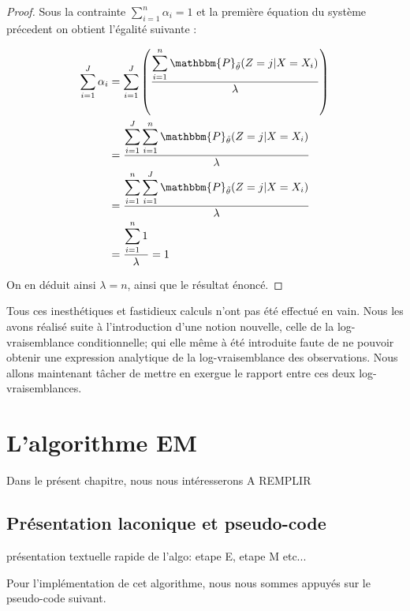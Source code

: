 \documentclass[frenchb]{report}
\newcommand{\1}{\mathbbm{1}}
\newcommand{\prob}{\mathbbm{P}}
\newcommand{\thetat}{\tilde{\theta}}
\theoremstyle{definition}\newtheorem{defn}{Définition}
\theoremstyle{definition}\newtheorem{exm}{Exemple}
\theoremstyle{definition}\newtheorem{nota}{Notation}
\theoremstyle{definition}\newtheorem{rem}{Remarque}
\begin{document}
\begin{proof}
Sous la contrainte $\displaystyle\sum_{i=1}^n\alpha_i =1$ et la première équation du système précedent on obtient l'égalité suivante : 

\begin{align*}
\sum_{i=1}^J\alpha_i &= \sum_{i=1}^J \left(\frac{\displaystyle\sum_{i=1}^n \prob_{\thetat}(Z=j|X=X_i)}{\lambda}\right)\\
&=\displaystyle\frac{\displaystyle\sum_{i=1}^J \sum_{i=1}^n \prob_{\thetat}(Z=j|X=X_i)}{\lambda}\\
&=\displaystyle\frac{\displaystyle\sum_{i=1}^n \sum_{i=1}^J \prob_{\thetat}(Z=j|X=X_i)}{\lambda}\\
&=\displaystyle\frac{\displaystyle\sum_{i=1}^n 1}{\lambda}= 1\\
\end{align*}

On en déduit ainsi $\lambda = n$, ainsi que le résultat énoncé.
\end{proof}


Tous ces inesthétiques et fastidieux calculs n'ont pas été effectué en vain. Nous les avons réalisé suite à l'introduction d'une notion nouvelle, celle de la log-vraisemblance conditionnelle; qui elle même à été introduite faute de ne pouvoir obtenir une expression analytique de la log-vraisemblance des observations. Nous allons maintenant tâcher de mettre en exergue le rapport entre ces deux log-vraisemblances. \newline

\pagebreak
\chapter{L'algorithme EM}

Dans le présent chapitre, nous nous intéresserons A REMPLIR 


\section{Présentation laconique et pseudo-code}

{\color{red}  présentation textuelle rapide de l'algo: etape E, etape M etc...}

Pour l'implémentation de cet algorithme, nous nous sommes appuyés sur le pseudo-code suivant.
\end{document}
